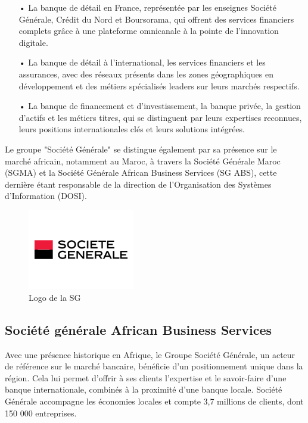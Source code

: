 \begin{itemize}

    \item[•] La banque de détail en France, représentée par les enseignes Société Générale, Crédit du Nord et Boursorama, qui offrent des services financiers complets grâce à une plateforme omnicanale à la pointe de l'innovation digitale.
    
    \item[•] La banque de détail à l'international, les services financiers et les assurances, avec des réseaux présents dans les zones géographiques en développement et des métiers spécialisés leaders sur leurs marchés respectifs.
    
    \item[•] La banque de financement et d'investissement, la banque privée, la gestion d'actifs et les métiers titres, qui se distinguent par leurs expertises reconnues, leurs positions internationales clés et leurs solutions intégrées.
    
 \end{itemize}

Le groupe "Société Générale" se distingue également par sa présence sur le marché africain, notamment au Maroc, à travers la Société Générale Maroc (SGMA) et la Société Générale African Business Services (SG ABS), cette dernière étant responsable de la direction de l'Organisation des Systèmes d'Information (DOSI).\cite{SG}

\begin{figure}[!h]
    \centering %
        \includegraphics[height=3.5cm]{images/logos/Societe Generale.png}
    \caption{Logo de la SG}
\end{figure}

\subsection{Société générale African Business Services}
Avec une présence historique en Afrique, le Groupe Société Générale, un acteur de référence sur le marché bancaire, bénéficie d'un positionnement unique dans la région. Cela lui permet d'offrir à ses clients l'expertise et le savoir-faire d'une banque internationale, combinés à la proximité d'une banque locale. Société Générale accompagne les économies locales et compte 3,7 millions de clients, dont 150 000 entreprises.\\

